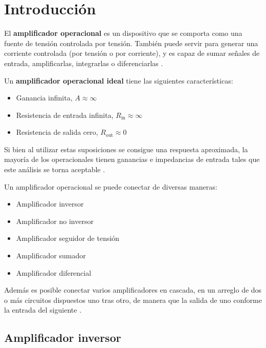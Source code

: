 \section{Introducción}

El \textbf{amplificador operacional} es un dispositivo que se comporta como una fuente de tensión controlada por tensión. También puede servir para generar una corriente controlada (por tensión o por corriente), y es capaz de sumar señales de entrada, amplificarlas, integrarlas o diferenciarlas \cite[pág. 176]{FDCE}. 


Un \textbf{amplificador operacional ideal} tiene las siguientes características:

\begin{itemize}
    \item Ganancia infinita, $A\approx\infty$
    \item Resistencia de entrada infinita, $R_{\text{in}} \approx \infty$
    \item Resistencia de salida cero, $R_{\text{out}} \approx 0$
\end{itemize}

Si bien al utilizar estas suposiciones se consigue una respuesta aproximada, la mayoría de los operacionales tienen ganancias e impedancias de entrada tales que este análisis se torna aceptable \cite[pág. 180]{FDCE}.

Un amplificador operacional se puede conectar de diversas maneras:

\begin{itemize}
    \item Amplificador inversor
    \item Amplificador no inversor
    \item Amplificador seguidor de tensión
    \item Amplificador sumador
    \item Amplificador diferencial
\end{itemize}

Además es posible conectar varios amplificadores en cascada, en un arreglo de dos o más circuitos dispuestos uno tras otro, de manera que la salida de uno conforme la entrada del siguiente \cite[pág. 191]{FDCE}.

\subsection{Amplificador inversor}
\label{sec:intro:opamp-inversor}


